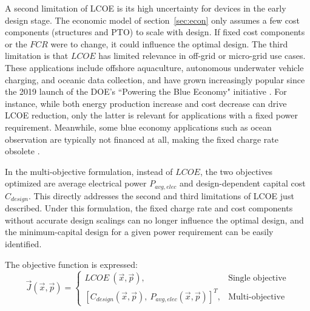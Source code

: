 A second limitation of LCOE is its high uncertainty for devices in the early design stage.
The economic model of section~\ref{sec:econ} only assumes a few cost components (structures and PTO) to scale with design.
If fixed cost components or the $FCR$ were to change, it could influence the optimal design.
The third limitation is that $LCOE$ has limited relevance in off-grid or micro-grid use cases.
These applications include offshore aquaculture, autonomous underwater vehicle charging, and oceanic data collection, and have grown increasingly popular since the 2019 launch of the DOE's ``Powering the Blue Economy" initiative \cite{livecchi_powering_2019}.
For instance, while both energy production increase and cost decrease can drive LCOE reduction, only the latter is relevant for applications with a fixed power requirement.
Meanwhile, some blue economy applications such as ocean observation are typically not financed at all, making the fixed charge rate obsolete \cite{jenne_powering_2021}. 

In the multi-objective formulation, instead of $LCOE$, the two objectives optimized are average electrical power $P_{avg,elec}$ and design-dependent capital cost $C_{design}$.
This directly addresses the second and third limitations of LCOE just described.
Under this formulation, the fixed charge rate and cost components without accurate design scalings can no longer influence the optimal design, and the minimum-capital design for a given power requirement can be easily identified.

The objective function is expressed:
\begin{equation}
\vec{J}(\vec{x}, \vec{p}) = \begin{cases} LCOE\ (\vec{x}, \vec{p}), & \text{Single objective} \\
[C_{design} (\vec{x}, \vec{p}),\ P_{avg,elec} (\vec{x}, \vec{p})]^T, & \text{Multi-objective}
\end{cases}
\label{obj}
\end{equation}

